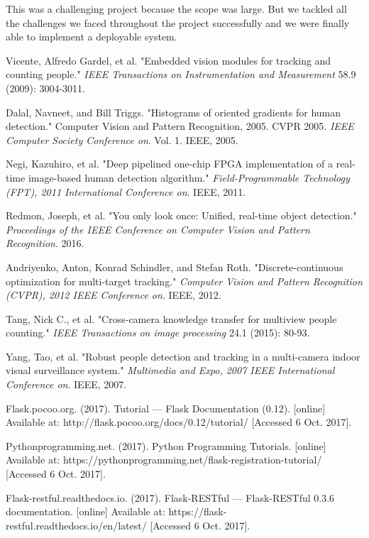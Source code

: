 \documentclass[12pt,a4paper]{report}
\begin{document}
\par This was a challenging project because the scope was large. But we tackled all the challenges we faced throughout the project successfully and we were finally able to implement a deployable system. 




\newpage
\begin{thebibliography}{10}

Vicente, Alfredo Gardel, et al. "Embedded vision modules for tracking and counting people." \textit{IEEE Transactions on Instrumentation and Measurement} 58.9 (2009): 3004-3011.

Dalal, Navneet, and Bill Triggs. "Histograms of oriented gradients for human detection." Computer Vision and Pattern Recognition, 2005. CVPR 2005. \textit{IEEE Computer Society Conference on}. Vol. 1. IEEE, 2005.

Negi, Kazuhiro, et al. "Deep pipelined one-chip FPGA implementation of a real-time image-based human detection algorithm." \textit{Field-Programmable Technology (FPT), 2011 International Conference on}. IEEE, 2011.

Redmon, Joseph, et al. "You only look once: Unified, real-time object detection." \textit{Proceedings of the IEEE Conference on Computer Vision and Pattern Recognition}. 2016.

Andriyenko, Anton, Konrad Schindler, and Stefan Roth. "Discrete-continuous optimization for multi-target tracking." \textit{Computer Vision and Pattern Recognition (CVPR), 2012 IEEE Conference on}. IEEE, 2012.

Tang, Nick C., et al. "Cross-camera knowledge transfer for multiview people counting." \textit{IEEE Transactions on image processing} 24.1 (2015): 80-93.

Yang, Tao, et al. "Robust people detection and tracking in a multi-camera indoor visual surveillance system." \textit{Multimedia and Expo, 2007 IEEE International Conference on}. IEEE, 2007.

Flask.pocoo.org. (2017). Tutorial — Flask Documentation (0.12). [online] Available at: http://flask.pocoo.org/docs/0.12/tutorial/ [Accessed 6 Oct. 2017].

Pythonprogramming.net. (2017). Python Programming Tutorials. [online] Available at: https://pythonprogramming.net/flask-registration-tutorial/ [Accessed 6 Oct. 2017].

Flask-restful.readthedocs.io. (2017). Flask-RESTful — Flask-RESTful 0.3.6 documentation. [online] Available at: https://flask-restful.readthedocs.io/en/latest/ [Accessed 6 Oct. 2017].
\end{thebibliography}
\end{document}
